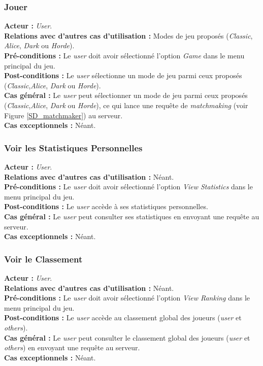 \documentclass[10pt, a4paper]{article}
\begin{document}
\subsubsection{Jouer}
\textbf{Acteur :} \textit{User}.\\
\textbf{Relations avec d'autres cas d'utilisation :} Modes de jeu proposés (\textit{Classic}, \textit{Alice}, \textit{Dark} ou \textit{Horde}).\\
\textbf{Pré-conditions :} Le \textit{user} doit avoir sélectionné l'option \textit{Game} dans le menu principal du jeu.\\
\textbf{Post-conditions :} Le  \textit{user} sélectionne un mode de jeu parmi ceux proposés (\textit{Classic},\textit{Alice}, \textit{Dark} ou \textit{Horde}).\\
\textbf{Cas général :} Le  \textit{user} peut sélectionner un mode de jeu parmi ceux proposés (\textit{Classic},\textit{Alice}, \textit{Dark} ou \textit{Horde}), ce qui lance une requête de \textit{matchmaking} (voir Figure \ref{SD_matchmaker}) au serveur.\\
\textbf{Cas exceptionnels :} Néant.



\subsubsection{Voir les Statistiques Personnelles}
\textbf{Acteur :} \textit{User}.\\
\textbf{Relations avec d'autres cas d'utilisation :} Néant.\\
\textbf{Pré-conditions :} Le \textit{user} doit avoir sélectionné l'option \textit{View Statistics} dans le menu principal du jeu.\\
\textbf{Post-conditions :} Le \textit{user} accède à ses statistiques personnelles.\\
\textbf{Cas général :} Le \textit{user} peut consulter ses statistiques en envoyant une requête au serveur.\\
\textbf{Cas exceptionnels :} Néant.

\subsubsection{Voir le Classement}
\textbf{Acteur :} \textit{User}.\\
\textbf{Relations avec d'autres cas d'utilisation :} Néant.\\
\textbf{Pré-conditions :} Le \textit{user} doit avoir sélectionné l'option \textit{View Ranking} dans le menu principal du jeu.\\
\textbf{Post-conditions :} Le \textit{user} accède au classement global des joueurs (\textit{user} et \textit{others}).\\
\textbf{Cas général :} Le \textit{user} peut consulter le classement global des joueurs (\textit{user} et \textit{others}) en envoyant une requête au serveur.\\
\textbf{Cas exceptionnels :} Néant.
\end{document}
